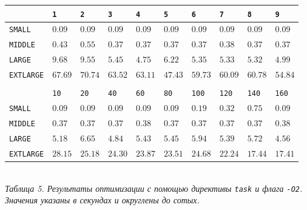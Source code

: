 \documentclass[a4paper, 11pt]{article}
\begin{document}
\begin{center}
    \begin{tabular}{l | l l l l l l l l l}
        & \texttt{1} & \texttt{2} & \texttt{3} & \texttt{4} & \texttt{5} & \texttt{6} & \texttt{7} & \texttt{8} & \texttt{9} \\
        \hline
        \texttt{SMALL}    & $0.09$ & $0.09$ & $0.09$ & $0.09$ & $0.09$ & $0.09$ & $0.09$ & $0.09$ & $0.09$ \\
        \texttt{MIDDLE}   & $0.43$ & $0.55$ & $0.37$ & $0.37$ & $0.37$ & $0.37$ & $0.38$ & $0.37$ & $0.37$ \\
        \texttt{LARGE}    & $9.68$ & $9.55$ & $5.45$ & $4.75$ & $6.22$ & $5.35$ & $5.33$ & $5.32$ & $4.99$ \\
        \texttt{EXTLARGE} & $67.69$ & $70.74$ & $63.52$ & $63.11$ & $47.43$ & $59.73$ & $60.09$ & $60.78$ & $54.84$ \\
        \vspace{0.4cm}\\
        & \texttt{10} & \texttt{20} & \texttt{40} & \texttt{60} & \texttt{80} & \texttt{100} & \texttt{120} & \texttt{140} & \texttt{160} \\
        \hline
        \texttt{SMALL}    & $0.09$ & $0.09$ & $0.09$ & $0.09$ & $0.09$ & $0.19$ & $0.32$ & $0.75$ & $0.09$ \\
        \texttt{MIDDLE}   & $0.37$ & $0.37$ & $0.37$ & $0.38$ & $0.37$ & $0.37$ & $0.37$ & $0.37$ & $0.38$ \\
        \texttt{LARGE}    & $5.18$ & $6.65$ & $4.84$ & $5.43$ & $5.45$ & $5.94$ & $5.39$ & $5.72$ & $4.56$ \\
        \texttt{EXTLARGE} & $28.15$ & $25.18$ & $24.30$ & $23.87$ & $23.51$ & $24.68$ & $22.24$ & $17.44$ & $17.41$ \\
    \end{tabular}\\
    \vspace{0.3cm}
    \small \it
    Таблица 5. Результаты оптимизации с помощью директивы \texttt{task} и флага \texttt{-O2}. Значения указаны в секундах и округлены до сотых.
\end{center}
\newpage
\end{document}
